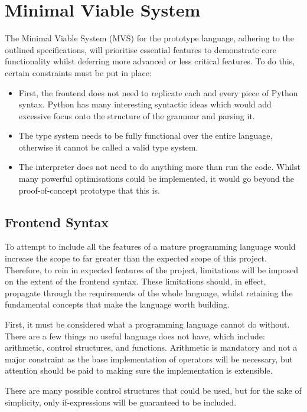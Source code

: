 \documentclass{l4proj}
\begin{document}
\section{Minimal Viable System}

The Minimal Viable System (MVS) for the prototype language, adhering to the outlined specifications, will prioritise essential features to demonstrate core functionality whilst deferring more advanced or less critical features.
To do this, certain constraints must be put in place:

\begin{itemize}
    \item First, the frontend does not need to replicate each and every piece of Python syntax.
    Python has many interesting syntactic ideas which would add excessive focus onto the structure of the grammar and parsing it. 
    \item The type system needs to be fully functional over the entire language, otherwise it cannot be called a valid type system.
    \item The interpreter does not need to do anything more than run the code.
    Whilst many powerful optimisations could be implemented, it would go beyond the proof-of-concept prototype that this is.
\end{itemize}

\subsection{Frontend Syntax}

To attempt to include all the features of a mature programming language would increase the scope to far greater than the expected scope of this project.
Therefore, to rein in expected features of the project, limitations will be imposed on the extent of the frontend syntax.
These limitations should, in effect, propagate through the requirements of the whole language, whilst retaining the fundamental concepts that make the language worth building.

First, it must be considered what a programming language cannot do without.
There are a few things no useful language does not have, which include: arithmetic, control structures, and functions.
Arithmetic is mandatory and not a major constraint as the base implementation of operators will be necessary, but attention should be paid to making sure the implementation is extensible.

There are many possible control structures that could be used, but for the sake of simplicity, only if-expressions will be guaranteed to be included. 
\end{document}
